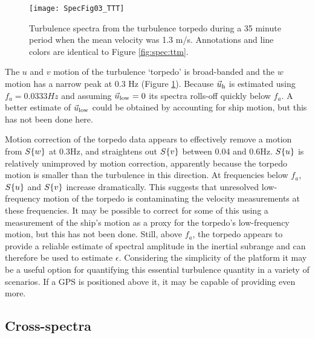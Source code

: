 \begin{figure}[t]
  \centering
  \texttt{[image: SpecFig03\_TTT]}
  \caption{Turbulence spectra from the turbulence torpedo during a 35 minute period when the mean velocity was 1.3 m/s. Annotations and line colors are identical to Figure \ref{fig:spec:ttm}.}
  \label{fig:spec:torpedo}
\end{figure}

The $u$ and $v$ motion of the turbulence `torpedo' is broad-banded and the $w$ motion has a narrow peak at 0.3 Hz (Figure \ref{fig:spec:torpedo}). Because $\vec{u}_\mathrm{h}$ is estimated using $f_a = 0.0333Hz$ and assuming $\vec{u}_\mathrm{low}=0$ its spectra rolls-off quickly below $f_a$. A better estimate of $\vec{u}_\mathrm{low}$ could be obtained by accounting for ship motion, but this has not been done here. 


Motion correction of the torpedo data appears to effectively remove a motion from $S\{w\}$ at 0.3Hz, and straightens out $S\{v\}$ between 0.04 and 0.6Hz. $S\{u\}$ is relatively unimproved by motion correction, apparently because the torpedo motion is smaller than the turbulence in this direction. At frequencies below $f_a$, $S\{u\}$ and $S\{v\}$ increase dramatically. This suggests that unresolved low-frequency motion of the torpedo is contaminating the velocity measurements at these frequencies. It may be possible to correct for some of this using a measurement of the ship's motion as a proxy for the torpedo's low-frequency motion, but this has not been done. Still, above $f_a$, the torpedo appears to provide a reliable estimate of spectral amplitude in the inertial subrange and can therefore be used to estimate $\epsilon$. Considering the simplicity of the platform it may be a useful option for quantifying this essential turbulence quantity in a variety of scenarios. If a GPS is positioned above it, it may be capable of providing even more.

\subsection{Cross-spectra}

